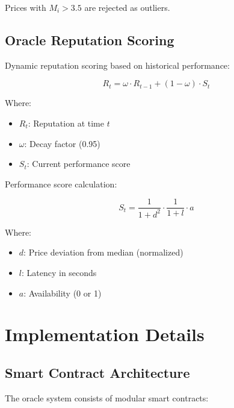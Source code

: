 \documentclass[11pt]{article}
\begin{document}
Prices with $M_i > 3.5$ are rejected as outliers.

\subsection{Oracle Reputation Scoring}

Dynamic reputation scoring based on historical performance:

\begin{equation}
R_t = \omega \cdot R_{t-1} + (1 - \omega) \cdot S_t
\end{equation}

Where:
\begin{itemize}
    \item $R_t$: Reputation at time $t$
    \item $\omega$: Decay factor (0.95)
    \item $S_t$: Current performance score
\end{itemize}

Performance score calculation:

\begin{equation}
S_t = \frac{1}{1 + d^2} \cdot \frac{1}{1 + l} \cdot a
\end{equation}

Where:
\begin{itemize}
    \item $d$: Price deviation from median (normalized)
    \item $l$: Latency in seconds
    \item $a$: Availability (0 or 1)
\end{itemize}

\section{Implementation Details}

\subsection{Smart Contract Architecture}

The oracle system consists of modular smart contracts:
\end{document}
